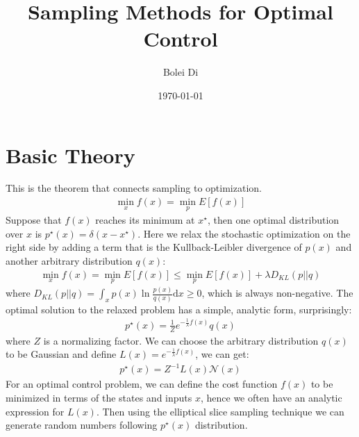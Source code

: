 \documentclass[11pt]{article}
\begin{document}
\title{\bf Sampling Methods for Optimal Control}
\date{\today}
\author{Bolei Di}
\maketitle
\begin{abstract}

\end{abstract}

\section{Basic Theory}\label{sec:intro}
This is the theorem that connects sampling to optimization.
\begin{gather*}
\min_x f(x) = \min_p E[f(x)]
\end{gather*}
Suppose that $f(x)$ reaches its minimum at $x^{\star}$, then one optimal distribution over $x$ is $p^{\star}(x)=\delta(x-x^{\star})$. 
Here we relax the stochastic optimization on the right side by adding a term that is the Kullback-Leibler divergence of $p(x)$ and another arbitrary distribution $q(x)$:
\begin{gather*}
\min_x f(x) = \min_p E[f(x)] \leq \min_p E[f(x)] + \lambda D_{KL}(p||q)
\end{gather*}
where $D_{KL}(p||q)=\int_x p(x) \ln \frac{p(x)}{q(x)} \text{d}x \geq 0$, which is always non-negative. 
The optimal solution to the relaxed problem has a simple, analytic form, surprisingly:
\begin{gather*}
p^{\star}(x) = \frac{1}{Z} e^{-\frac{1}{\lambda}f(x)} q(x)
\end{gather*}
where $Z$ is a normalizing factor. 
We can choose the arbitrary distribution $q(x)$ to be Gaussian and define $L(x)=e^{-\frac{1}{\lambda}f(x)}$, we can get:
\begin{gather*}
p^{\star}(x) = Z^{-1} L(x) \mathcal{N}(x)
\end{gather*}
For an optimal control problem, we can define the cost function $f(x)$ to be minimized in terms of the states and inputs $x$, hence we often have an analytic expression for $L(x)$. Then using the elliptical slice sampling technique we can generate random numbers following $p^{\star}(x)$ distribution. 
\end{document}
